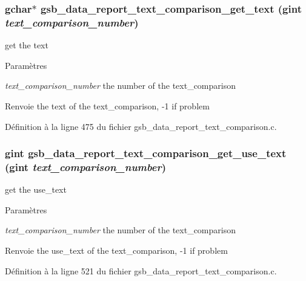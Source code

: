 \subsubsection[{gsb\_\-data\_\-report\_\-text\_\-comparison\_\-get\_\-text}]{\setlength{\rightskip}{0pt plus 5cm}gchar$\ast$ gsb\_\-data\_\-report\_\-text\_\-comparison\_\-get\_\-text (gint {\em text\_\-comparison\_\-number})}\label{gsb__data__report__text__comparison_8h_a787124a1b15143ea18ec069a47fada01}
get the text


\begin{DoxyParams}{Paramètres}
\item[{\em text\_\-comparison\_\-number}]the number of the text\_\-comparison\end{DoxyParams}
\begin{DoxyReturn}{Renvoie}
the text of the text\_\-comparison, -\/1 if problem 
\end{DoxyReturn}


Définition à la ligne 475 du fichier gsb\_\-data\_\-report\_\-text\_\-comparison.c.

\subsubsection[{gsb\_\-data\_\-report\_\-text\_\-comparison\_\-get\_\-use\_\-text}]{\setlength{\rightskip}{0pt plus 5cm}gint gsb\_\-data\_\-report\_\-text\_\-comparison\_\-get\_\-use\_\-text (gint {\em text\_\-comparison\_\-number})}\label{gsb__data__report__text__comparison_8h_a0eb8e0a0e157e3bf8a518a09ab99203e}
get the use\_\-text


\begin{DoxyParams}{Paramètres}
\item[{\em text\_\-comparison\_\-number}]the number of the text\_\-comparison\end{DoxyParams}
\begin{DoxyReturn}{Renvoie}
the use\_\-text of the text\_\-comparison, -\/1 if problem 
\end{DoxyReturn}


Définition à la ligne 521 du fichier gsb\_\-data\_\-report\_\-text\_\-comparison.c.

